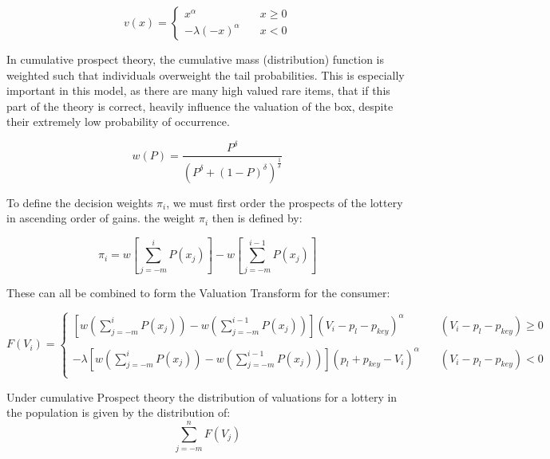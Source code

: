 \documentclass[12pt]{paper}
\begin{document}
\begin{equation}
  \label{piecewiseValuation}
  v(x) =
  \begin{cases}
    x^\alpha \quad &x \geq 0\\
    -\lambda(-x)^\alpha \quad &x < 0
  \end{cases}
\end{equation}

In cumulative prospect theory, the cumulative mass (distribution)
function is weighted such that individuals overweight the tail
probabilities. This is especially important in this model, as there are
many high valued rare items, that if this part of the theory is
correct, heavily influence the valuation of the box, despite their
extremely low probability of occurrence.

\begin{equation}
  \label{weightFunction}
  w(P) = \frac{ P^\delta }{( P^\delta + (1-P)^\delta )^{\frac{1}{\delta}}}
\end{equation}

To define the decision weights $\pi_i$, we must first order the prospects
of the lottery in ascending order of gains. the weight $\pi_i$ then is
defined by:

\begin{equation}
  \label{piWeights}
  \pi_i = w \left[ \sum_{j = -m}^i P(x_j) \right] - w \left[ \sum_{j=-m}^{i-1} P(x_j) \right]
\end{equation}

These can all be combined to form the Valuation Transform for the
consumer:

\begin{equation}
\label{Valuation}
F(V_i) = \begin{cases}
\left[w\left( \sum_{j = -m}^i P(x_j) \right) - w\left( \sum_{j=-m}^{i-1} P(x_j) \right)\right](V_i - p_l - p_{key})^\alpha \quad &(V_i - p_l - p_{key}) \geq 0 \\\\
-\lambda \left[  w\left( \sum_{j = -m}^i P(x_j) \right) - w\left( \sum_{j=-m}^{i-1} P(x_j) \right)\right] (p_l + p_{key} - V_i)^\alpha \quad &(V_i - p_l - p_{key}) < 0 \\
\end{cases}
\end{equation}


Under cumulative Prospect theory the distribution of valuations for
a lottery in the population is given by the distribution of:
\begin{equation}
  \sum_{j=-m}^n  F(V_j)  
\end{equation}
\end{document}
